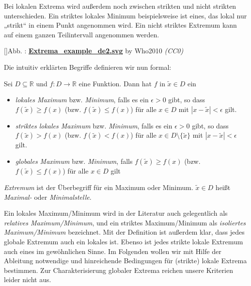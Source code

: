\documentclass[fontsize=9pt,
               parskip=half-,
               DIV=14,
               listof=chapterentry,
               tocflat]{scrbook}
\newcounter{imagelabel}
\begin{document}
Bei lokalen Extrema wird außerdem noch zwischen strikten und nicht strikten unterschieden. Ein striktes lokales Minimum beispielsweise ist eines, das lokal nur „strikt“ in einem Punkt angenommen wird. Ein nicht striktes Extremum kann auf einem ganzen Teilintervall angenommen werden.

[]{Abb. : \protect\href{https://commons.wikimedia.org/wiki/File:Extrema_example_de2.svg}{\textbf{Extrema\allowbreak\_example\allowbreak\_de2.svg}} by Who2010 \textit{(CC0)}}\begin{center}
\end{center}

Die intuitiv erklärten Begriffe definieren wir nun formal:

\begin{definition*}[Extrema]
Sei $D\subseteq \mathbb {R} $ und $f:D\to \mathbb {R} $ eine Funktion. Dann hat $f$ in ${\tilde {x}}\in D$ ein

\begin{itemize}
\item \emph{lokales Maximum} bzw. \emph{Minimum}, falls es ein $\epsilon >0$ gibt, so dass $f({\tilde {x}})\geq f(x)$ (bzw. $f({\tilde {x}})\leq f(x)$) für alle $x\in D$ mit $|x-{\tilde {x}}|<\epsilon $ gilt.
\item \emph{striktes lokales Maximum} bzw. \emph{Minimum}, falls es ein $\epsilon >0$ gibt, so dass $f({\tilde {x}})>f(x)$ (bzw. $f({\tilde {x}})<f(x)$) für alle $x\in D\setminus \{{\tilde {x}}\}$ mit $|x-{\tilde {x}}|<\epsilon $ gilt.
\item \emph{globales Maximum} bzw. \emph{Minimum}, falls $f({\tilde {x}})\geq f(x)$ (bzw. $f({\tilde {x}})\leq f(x)$) für alle $x\in D$ gilt
\end{itemize}

\emph{Extremum} ist der Überbegriff für ein Maximum oder Minimum. ${\tilde {x}}\in D$ heißt \emph{Maximal-} oder \emph{Minimalstelle}.

\end{definition*}

Ein lokales Maximum/Minimum wird in der Literatur auch gelegentlich als \emph{relatives Maximum/Minimum}, und ein striktes Maximum/Minimum als \emph{isoliertes Maximum/Minimum} bezeichnet. Mit der Definition ist außerdem klar, dass jedes globale Extremum auch ein lokales ist. Ebenso ist jedes strikte lokale Extremum auch eines im gewöhnlichen Sinne. Im Folgenden wollen wir mit Hilfe der Ableitung notwendige und hinreichende Bedingungen für (strikte) lokale Extrema bestimmen. Zur Charakterisierung globaler Extrema reichen unsere Kriterien leider nicht aus.
\end{document}
